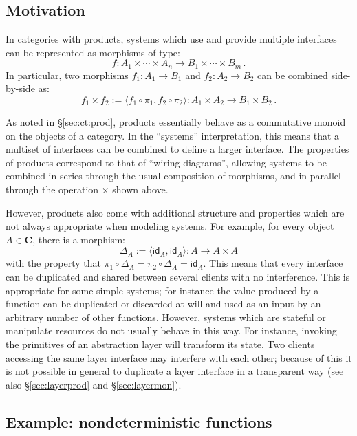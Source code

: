 \documentclass[11pt,oneside,draft]{book}
\theoremstyle{definition}
\newcommand{\kw}[1]{\ensuremath{ \mathsf{#1} }}
\begin{document}
\subsection{Motivation} %

In categories with
products, systems
which use and provide multiple interfaces
can be represented
as morphisms of type:
\[
  f : A_1 \times \cdots \times A_n \rightarrow
      B_1 \times \cdots \times B_m
  \,.
\]
In particular,
two morphisms
$f_1 : A_1 \rightarrow B_1$ and
$f_2 : A_2 \rightarrow B_2$
can be combined side-by-side
as:
\[
  f_1 \times f_2 :=
  \langle f_1 \circ \pi_1, f_2 \circ \pi_2 \rangle :
  A_1 \times A_2 \rightarrow B_1 \times B_2
  \,.
\]

As noted in \S\ref{sec:ct:prod},
products essentially behave as a commutative monoid
on the objects of a category.
In the ``systems'' interpretation,
this means that a multiset of interfaces
can be combined to define a larger interface.
The properties of products
correspond to that of ``wiring diagrams'',
allowing systems to be combined in series
through the usual composition of morphisms,
and in parallel through the operation $\times$
shown above.

However,
products also come with additional structure and properties
which are not always appropriate
when modeling systems.
For example,
for every object $A \in \mathbf{C}$,
there is a morphism:
\[
  \Delta_A := \langle \kw{id}_A, \kw{id}_A \rangle :
    A \rightarrow A \times A
\]
with the property that
$\pi_1 \circ \Delta_A = \pi_2 \circ \Delta_A = \kw{id}_A$.
This means that every interface can be duplicated
and shared between several clients with no interference.
This is appropriate for some simple systems;
for instance the value produced by a function
can be duplicated or discarded at will
and used as an input by an arbitrary number of other functions.
However,
systems which are stateful or manipulate resources
do not usually behave in this way.
For instance,
invoking the primitives of an abstraction layer
will transform its state.
Two clients accessing the same layer interface
may interfere with each other;
because of this it is not possible in general
to duplicate a layer interface
in a transparent way
(see also \S\ref{sec:layerprod} and \S\ref{sec:layermon}).


\subsection{Example: nondeterministic functions} \label{sec:sup} %
\end{document}

